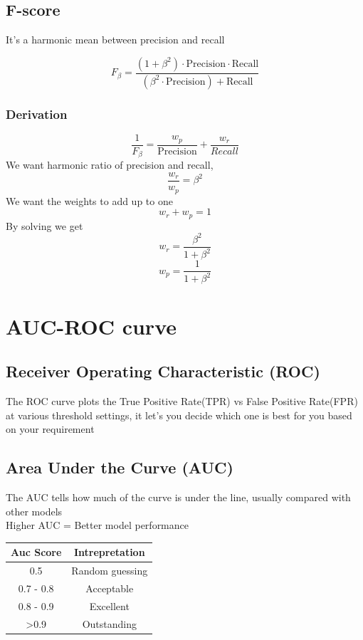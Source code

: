 \documentclass[12pt]{extarticle}
\begin{document}
\subsection{F-score}
It's a harmonic mean between precision and recall

$$F_\beta = \frac{(1 + \beta^2) \cdot \text{Precision} \cdot \text{Recall}}{(\beta^2 \cdot \text{Precision}) + \text{Recall}}$$
\subsubsection{Derivation} 
$$ \frac{1}{F_\beta} = \frac{w_p}{\text{Precision}} + \frac{w_r}{Recall} $$
We want harmonic ratio of precision and recall, 
$$ \frac{w_r}{w_p} = \beta^2$$
We want the weights to add up to one
$$ w_r + w_p = 1 $$
By solving we get
$$ w_r = \frac{\beta^2}{1 + \beta^2} $$ 
$$ w_p = \frac{1}{1 + \beta^2} $$

\section{AUC-ROC curve}
\subsection{Receiver Operating Characteristic (ROC)}
The ROC curve plots the True Positive Rate(TPR) vs False Positive Rate(FPR) at various threshold settings,
it let's you decide which one is best for you based on your requirement
\subsection{Area Under the Curve (AUC)}
The AUC tells how much of the curve is under the line,
usually compared with other models\\
Higher AUC = Better model performance \\

\begin{table}[H]
    \centering
    \begin{tabular}{|c|c|}
        \hline
        Auc Score & Intrepretation \\
        \hline
         0.5 &  Random guessing \\
         0.7 - 0.8 & Acceptable \\
         0.8 - 0.9 & Excellent \\
         \textgreater 0.9 & Outstanding\\
         \hline     
    \end{tabular}
\end{table}
\end{document}
